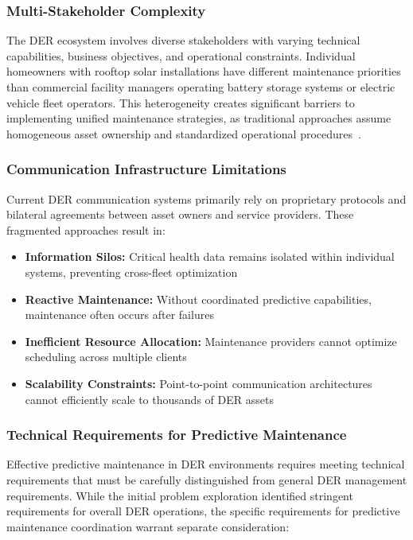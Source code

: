\documentclass[12pt,a4paper]{article}
\begin{document}
\subsubsection{Multi-Stakeholder Complexity}

The DER ecosystem involves diverse stakeholders with varying technical capabilities, business objectives, and operational constraints. Individual homeowners with rooftop solar installations have different maintenance priorities than commercial facility managers operating battery storage systems or electric vehicle fleet operators. This heterogeneity creates significant barriers to implementing unified maintenance strategies, as traditional approaches assume homogeneous asset ownership and standardized operational procedures~\cite{parag2016}.

\subsubsection{Communication Infrastructure Limitations}

Current DER communication systems primarily rely on proprietary protocols and bilateral agreements between asset owners and service providers. These fragmented approaches result in:
\begin{itemize}
\item \textbf{Information Silos:} Critical health data remains isolated within individual systems, preventing cross-fleet optimization
\item \textbf{Reactive Maintenance:} Without coordinated predictive capabilities, maintenance often occurs after failures
\item \textbf{Inefficient Resource Allocation:} Maintenance providers cannot optimize scheduling across multiple clients
\item \textbf{Scalability Constraints:} Point-to-point communication architectures cannot efficiently scale to thousands of DER assets
\end{itemize}

\subsubsection{Technical Requirements for Predictive Maintenance}

Effective predictive maintenance in DER environments requires meeting technical requirements that must be carefully distinguished from general DER management requirements. While the initial problem exploration identified stringent requirements for overall DER operations, the specific requirements for predictive maintenance coordination warrant separate consideration:
\end{document}
